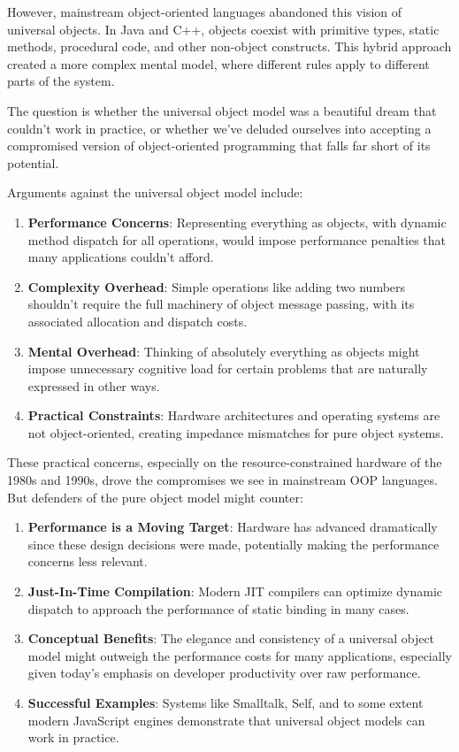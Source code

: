 \documentclass[11pt]{article}
\begin{document}
However, mainstream object-oriented languages abandoned this vision of universal objects. In Java and C++, objects coexist with primitive types, static methods, procedural code, and other non-object constructs. This hybrid approach created a more complex mental model, where different rules apply to different parts of the system.

The question is whether the universal object model was a beautiful dream that couldn't work in practice, or whether we've deluded ourselves into accepting a compromised version of object-oriented programming that falls far short of its potential.

Arguments against the universal object model include:

\begin{enumerate}
\item \textbf{Performance Concerns}: Representing everything as objects, with dynamic method dispatch for all operations, would impose performance penalties that many applications couldn't afford.

\item \textbf{Complexity Overhead}: Simple operations like adding two numbers shouldn't require the full machinery of object message passing, with its associated allocation and dispatch costs.

\item \textbf{Mental Overhead}: Thinking of absolutely everything as objects might impose unnecessary cognitive load for certain problems that are naturally expressed in other ways.

\item \textbf{Practical Constraints}: Hardware architectures and operating systems are not object-oriented, creating impedance mismatches for pure object systems.
\end{enumerate}

These practical concerns, especially on the resource-constrained hardware of the 1980s and 1990s, drove the compromises we see in mainstream OOP languages. But defenders of the pure object model might counter:

\begin{enumerate}
\item \textbf{Performance is a Moving Target}: Hardware has advanced dramatically since these design decisions were made, potentially making the performance concerns less relevant.

\item \textbf{Just-In-Time Compilation}: Modern JIT compilers can optimize dynamic dispatch to approach the performance of static binding in many cases.

\item \textbf{Conceptual Benefits}: The elegance and consistency of a universal object model might outweigh the performance costs for many applications, especially given today's emphasis on developer productivity over raw performance.

\item \textbf{Successful Examples}: Systems like Smalltalk, Self, and to some extent modern JavaScript engines demonstrate that universal object models can work in practice.
\end{enumerate}
\end{document}
